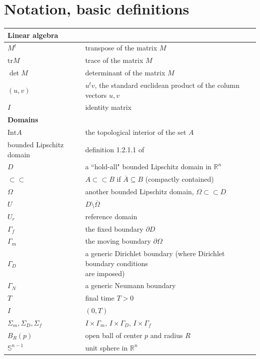 \documentclass[english,a4paper,10pt,oneside]{scrbook}	%
\theoremstyle{break}
\theoremstyle{remark}
\newcommand{\mR}{\mathbb{R}}
\newcommand{\mS}{\mathbb{S}^{n-1}}
\newcommand{\tr}{\text{tr}}
\newcommand{\cc}{\subset\subset}
\begin{document}
\chapter*{Notation, basic definitions}
\label{chap:notation}
\begin{longtable}{ll}
\hline

\multicolumn{2}{l}{\textbf{Linear algebra}}    \\ 
\hline
$M^t$ & transpose of the matrix $M$                \\ 
\hline
$\tr M $ & trace of the matrix $M$                \\ 
\hline
$\det M $ & determinant of the matrix $M$                \\ 
\hline
$(u,v)$ & $u^tv$, the standard euclidean product of the column vectors $u,v$                       \\ 
\hline 
$I$ & identity matrix                       \\ 
\hline 

\multicolumn{2}{l}{\textbf{Domains}}    \\ 
\hline
$\text{Int}A$ & the topological interior of the set $A$                \\ 
\hline
bounded Lipschitz domain & definition 1.2.1.1 of \cite{grisvard}                     \\ 
\hline
$D$ & a ``hold-all" bounded Lipschitz domain in $\mR^n$ \\ 
\hline
$\cc$ & $A\cc B$ if $\overline{A} \subseteq B$ (compactly contained)                       \\ 
\hline
$\Omega$ & another bounded Lipschitz domain, $\Omega \cc D$                \\ 
\hline
$U$ & $D\setminus \overline{\Omega}$                \\ 
\hline
$U_r$ & reference domain                \\ 
\hline
$\Gamma_f$ & the fixed boundary $\partial D$                \\ 
\hline
$\Gamma_m$ & the moving boundary $\partial \Omega$                \\ 
\hline
$\Gamma_D$ & \makecell[l]{a generic Dirichlet boundary (where Dirichlet boundary conditions\\ are imposed)}               \\
\hline
$\Gamma_N$ & a generic Neumann boundary                \\  
\hline
$T$ & final time $T>0$                \\  
\hline
$I$ & $(0,T)$                \\  
\hline
$\Sigma_m, \Sigma_D, \Sigma_f$ & $I\times \Gamma_m$, $I\times \Gamma_D$, $I\times \Gamma_f$                \\  
\hline
$B_R(p)$ & open ball of center $p$ and radius $R$                \\  
\hline
$\mS$ & unit sphere in $\mR^n$                \\  
\hline



\end{longtable}
\end{document}
